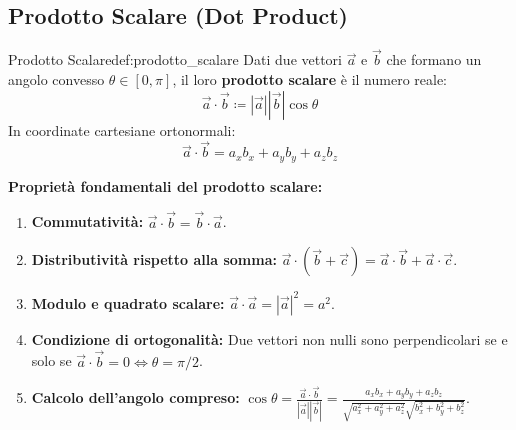 \subsection{Prodotto Scalare (Dot Product)}

\begin{definizione}{Prodotto Scalare}{def:prodotto_scalare}
Dati due vettori $\vec{a}$ e $\vec{b}$ che formano un angolo convesso $\theta \in [0, \pi]$, il loro \textbf{prodotto scalare} è il numero reale:
\begin{equation}
    \vec{a}\cdot\vec{b} \coloneqq |\vec{a}| |\vec{b}| \cos\theta
    \label{eq:prodotto_scalare_geo}
\end{equation}
In coordinate cartesiane ortonormali:
\begin{equation}
    \vec{a}\cdot\vec{b} = a_x b_x + a_y b_y + a_z b_z
    \label{eq:prodotto_scalare_cart}
\end{equation}
\end{definizione}

\begin{center}
\end{center}

\textbf{Proprietà fondamentali del prodotto scalare:}
\begin{enumerate}
    \item \textbf{Commutatività:} $\vec{a}\cdot\vec{b} = \vec{b}\cdot\vec{a}$.
    \item \textbf{Distributività rispetto alla somma:} $\vec{a}\cdot(\vec{b} + \vec{c}) = \vec{a}\cdot\vec{b} + \vec{a}\cdot\vec{c}$.
    \item \textbf{Modulo e quadrato scalare:} $\vec{a}\cdot\vec{a} = |\vec{a}|^2 = a^2$.
    \item \textbf{Condizione di ortogonalità:} Due vettori non nulli sono perpendicolari se e solo se $\vec{a}\cdot\vec{b} = 0 \iff \theta = \pi/2$.
    \item \textbf{Calcolo dell'angolo compreso:} $\cos\theta = \frac{\vec{a}\cdot\vec{b}}{|\vec{a}||\vec{b}|} = \frac{a_x b_x + a_y b_y + a_z b_z}{\sqrt{a_x^2+a_y^2+a_z^2}\sqrt{b_x^2+b_y^2+b_z^2}}$.
\end{enumerate}

